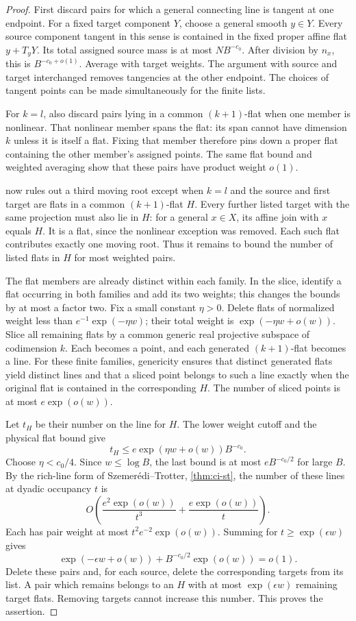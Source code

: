 \begin{proof}
First discard pairs for which a general connecting line is tangent at one endpoint. For a fixed target component $Y$, choose a general smooth $y\in Y$. Every source component tangent in this sense is contained in the fixed proper affine flat $y+T_yY$. Its total assigned source mass is at most $NB^{-c_0}$. After division by $n_x$, this is $B^{-c_0+o(1)}$. Average with target weights. The argument with source and target interchanged removes tangencies at the other endpoint. The choices of tangent points can be made simultaneously for the finite lists.

For $k=l$, also discard pairs lying in a common $(k+1)$-flat when one member is nonlinear. That nonlinear member spans the flat: its span cannot have dimension $k$ unless it is itself a flat. Fixing that member therefore pins down a proper flat containing the other member's assigned points. The same flat bound and weighted averaging show that these pairs have product weight $o(1)$.

 now rules out a third moving root except when $k=l$ and the source and first target are flats in a common $(k+1)$-flat $H$. Every further listed target with the same projection must also lie in $H$: for a general $x\in X$, its affine join with $x$ equals $H$. It is a flat, since the nonlinear exception was removed. Each such flat contributes exactly one moving root. Thus it remains to bound the number of listed flats in $H$ for most weighted pairs.

The flat members are already distinct within each family.  In the slice, identify a flat occurring in both families and add its two weights; this changes the bounds by at most a factor two. Fix a small constant $\eta>0$. Delete flats of normalized weight less than $e^{-1}\exp(-\eta w)$; their total weight is $\exp(-\eta w+o(w))$. Slice all remaining flats by a common generic real projective subspace of codimension $k$. Each becomes a point, and each generated $(k+1)$-flat becomes a line. For these finite families, genericity ensures that distinct generated flats yield distinct lines and that a sliced point belongs to such a line exactly when the original flat is contained in the corresponding $H$. The number of sliced points is at most $e\exp(o(w))$.

Let $t_H$ be their number on the line for $H$. The lower weight cutoff and the physical flat bound give
\[
 t_H\le e\exp(\eta w+o(w))B^{-c_0}.
\]
Choose $\eta<c_0/4$. Since $w\le\log B$, the last bound is at most $eB^{-c_0/2}$ for large $B$. By the rich-line form of Szemer\'edi--Trotter, \cref{thm:ci-st}, the number of these lines at dyadic occupancy $t$ is
\[
 O\!\left(\frac{e^2\exp(o(w))}{t^3}
            +\frac{e\exp(o(w))}{t}\right).
\]
Each has pair weight at most $t^2e^{-2}\exp(o(w))$. Summing for $t\ge\exp(\epsilon w)$ gives
\[
 \exp(-\epsilon w+o(w))+B^{-c_0/2}\exp(o(w))=o(1).
\]
Delete these pairs and, for each source, delete the corresponding targets from its list. A pair which remains belongs to an $H$ with at most $\exp(\epsilon w)$ remaining target flats. Removing targets cannot increase this number. This proves the assertion.


\end{proof}
